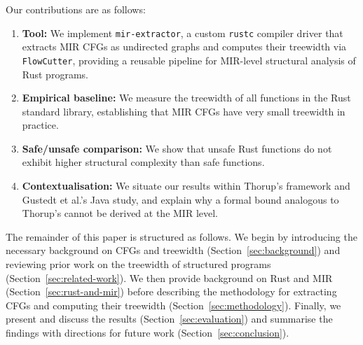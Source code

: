 \noindent Our contributions are as follows:
\begin{enumerate}
	\item \textbf{Tool:} We implement \texttt{mir-extractor}, a custom
	\texttt{rustc} compiler driver that extracts MIR CFGs as undirected graphs
	and computes their treewidth via \texttt{FlowCutter}, providing a reusable
	pipeline for MIR-level structural analysis of Rust programs.
	\item \textbf{Empirical baseline:} We measure the treewidth of all
	functions in the Rust standard library, establishing that MIR CFGs have
	very small treewidth in practice.
	\item \textbf{Safe/unsafe comparison:} We show that unsafe Rust functions
	do not exhibit higher structural complexity than safe functions.
	\item \textbf{Contextualisation:} We situate our results within Thorup's
	framework and Gustedt et al.'s Java study, and explain why a formal bound
	analogous to Thorup's cannot be derived at the MIR level.
\end{enumerate}

\noindent The remainder of this paper is structured as follows.
We begin by introducing the necessary background on CFGs and treewidth (Section~\ref{sec:background}) and reviewing prior work on the treewidth of structured programs (Section~\ref{sec:related-work}).
We then provide background on Rust and MIR (Section~\ref{sec:rust-and-mir}) before describing the methodology for extracting CFGs and computing their treewidth (Section~\ref{sec:methodology}).
Finally, we present and discuss the results (Section~\ref{sec:evaluation}) and summarise the findings with directions for future work (Section~\ref{sec:conclusion}).
